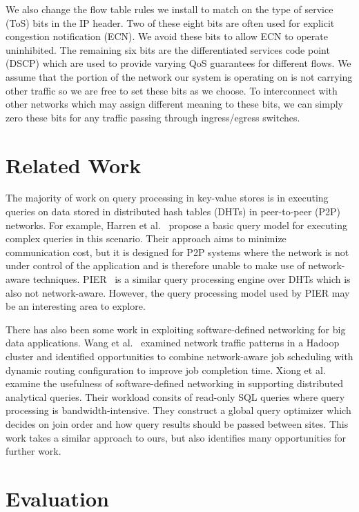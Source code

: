 \documentclass{sig-alternate-2013}
\begin{document}
We also change the flow table rules we install to match on the type of service (ToS) bits in the IP header.
Two of these eight bits are often used for explicit congestion notification (ECN).
We avoid these bits to allow ECN to operate uninhibited.
The remaining six bits are the differentiated services code point (DSCP) which are used to provide varying QoS guarantees for different flows.
We assume that the portion of the network our system is operating on is not carrying other traffic so we are free to set these bits as we choose.
To interconnect with other networks which may assign different meaning to these bits, we can simply zero these bits for any traffic passing through ingress/egress switches.

\section{Related Work}

The majority of work on query processing in key-value stores is in executing queries on data stored in distributed hash tables (DHTs) in peer-to-peer (P2P) networks.
For example, Harren et al.~\cite{Harren2002} propose a basic query model for executing complex queries in this scenario.
Their approach aims to minimize communication cost, but it is designed for P2P systems where the network is not under control of the application and is therefore unable to make use of network-aware techniques.
PIER~\cite{Huebsch2005} is a similar query processing engine over DHTs which is also not network-aware.
However, the query processing model used by PIER may be an interesting area to explore.

There has also been some work in exploiting software-defined networking for big data applications.
Wang et al.~\cite{Wang2012} examined network traffic patterns in a Hadoop cluster and identified opportunities to combine network-aware job scheduling with dynamic routing configuration to improve job completion time.
Xiong et al.~\cite{Xiong2014} examine the usefulness of software-defined networking in supporting distributed analytical queries.
Their workload consits of read-only SQL queries where query processing is bandwidth-intensive.
They construct a global query optimizer which decides on join order and how query results should be passed between sites.
This work takes a similar approach to ours, but also identifies many opportunities for further work.

\section{Evaluation}
\end{document}
